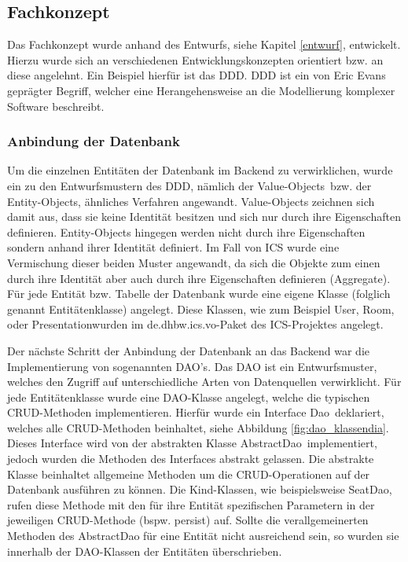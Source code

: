 	\subsection{Fachkonzept}
	
	Das Fachkonzept wurde anhand des Entwurfs, siehe Kapitel \ref{entwurf}, entwickelt. Hierzu wurde sich an verschiedenen Entwicklungskonzepten orientiert bzw. an diese angelehnt. Ein Beispiel hierfür ist das \ac{DDD}. \ac{DDD} ist ein von Eric Evans geprägter Begriff, welcher eine Herangehensweise an die Modellierung komplexer Software beschreibt. \autocite{WikimediaFoundationInc.2019a}
	
	\subsubsection{Anbindung der Datenbank}
	Um die einzelnen Entitäten der Datenbank im Backend zu verwirklichen, wurde ein zu den Entwurfsmustern des \ac{DDD}, nämlich der \glqq Value-Objects\grqq \, bzw. der \glqq Entity-Objects\grqq, ähnliches Verfahren angewandt. Value-Objects zeichnen sich damit aus, dass sie keine Identität besitzen und sich nur durch ihre Eigenschaften definieren. Entity-Objects hingegen werden nicht durch ihre Eigenschaften sondern anhand ihrer Identität definiert. \autocite{WikimediaFoundationInc.2019a} Im Fall von \ac{ICS} wurde eine Vermischung dieser beiden Muster angewandt, da sich die Objekte zum einen durch ihre Identität aber auch durch ihre Eigenschaften definieren (Aggregate). Für jede Entität bzw. Tabelle der Datenbank wurde eine eigene Klasse (folglich genannt Entitätenklasse) angelegt. Diese Klassen, wie zum Beispiel \glqq User\grqq , \glqq Room\grqq , oder \glqq Presentation\grqq wurden im \glqq de.dhbw.ics.vo\grqq-Paket des \ac{ICS}-Projektes angelegt.
	
	Der nächste Schritt der Anbindung der Datenbank an das Backend war die Implementierung von sogenannten \ac{DAO}'s. Das \ac{DAO} ist ein Entwurfsmuster, welches den Zugriff auf unterschiedliche Arten von Datenquellen verwirklicht. \autocite{WikimediaFoundationInc.2019b} Für jede Entitätenklasse wurde eine \ac{DAO}-Klasse angelegt, welche die typischen \ac{CRUD}-Methoden implementieren. Hierfür wurde ein Interface \glqq Dao\grqq \, deklariert, welches alle \ac{CRUD}-Methoden beinhaltet, siehe Abbildung \ref{fig:dao_klassendia}. Dieses Interface wird von der abstrakten Klasse \glqq AbstractDao\grqq \, implementiert, jedoch wurden die Methoden des Interfaces abstrakt gelassen. Die abstrakte Klasse beinhaltet allgemeine Methoden um die \ac{CRUD}-Operationen auf der Datenbank ausführen zu können. Die Kind-Klassen, wie beispielsweise \glqq SeatDao\grqq, rufen diese Methode mit den für ihre Entität spezifischen Parametern in der jeweiligen \ac{CRUD}-Methode (bspw. \glqq persist\grqq) auf. Sollte die verallgemeinerten Methoden des AbstractDao für eine Entität nicht ausreichend sein, so wurden sie innerhalb der DAO-Klassen der Entitäten überschrieben.
	
